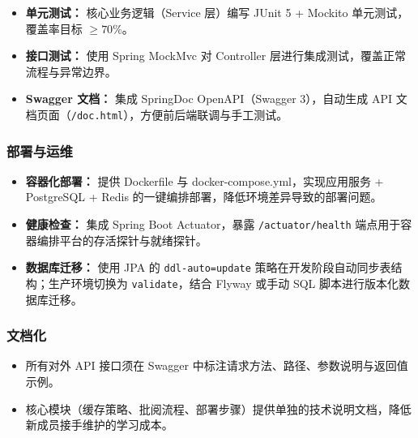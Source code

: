 \begin{itemize}
    \item \textbf{单元测试：} 核心业务逻辑（Service 层）编写 JUnit 5 + Mockito 单元测试，覆盖率目标 $\ge 70\%$。
    \item \textbf{接口测试：} 使用 Spring MockMvc 对 Controller 层进行集成测试，覆盖正常流程与异常边界。
    \item \textbf{Swagger 文档：} 集成 SpringDoc OpenAPI（Swagger 3），自动生成 API 文档页面（\texttt{/doc.html}），方便前后端联调与手工测试。
\end{itemize}

\subsubsection{部署与运维}

\begin{itemize}
    \item \textbf{容器化部署：} 提供 Dockerfile 与 docker-compose.yml，实现应用服务 + PostgreSQL + Redis 的一键编排部署，降低环境差异导致的部署问题。
    \item \textbf{健康检查：} 集成 Spring Boot Actuator，暴露 \texttt{/actuator/health} 端点用于容器编排平台的存活探针与就绪探针。
    \item \textbf{数据库迁移：} 使用 JPA 的 \texttt{ddl-auto=update} 策略在开发阶段自动同步表结构；生产环境切换为 \texttt{validate}，结合 Flyway 或手动 SQL 脚本进行版本化数据库迁移。
\end{itemize}

\subsubsection{文档化}

\begin{itemize}
    \item 所有对外 API 接口须在 Swagger 中标注请求方法、路径、参数说明与返回值示例。
    \item 核心模块（缓存策略、批阅流程、部署步骤）提供单独的技术说明文档，降低新成员接手维护的学习成本。
\end{itemize}

